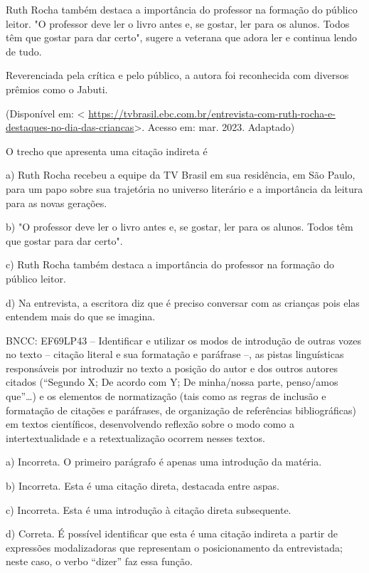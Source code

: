 Ruth Rocha também destaca a importância do professor na formação do
público leitor. "O professor deve ler o livro antes e, se gostar, ler
para os alunos. Todos têm que gostar para dar certo", sugere a veterana
que adora ler e continua lendo de tudo.

Reverenciada pela crítica e pelo público, a autora foi reconhecida com
diversos prêmios como o Jabuti.

(Disponível em: \textless{}
\url{https://tvbrasil.ebc.com.br/entrevista-com-ruth-rocha-e-destaques-no-dia-das-criancas}\textgreater.
Acesso em: mar. 2023. Adaptado)

O trecho que apresenta uma citação indireta é

a) Ruth Rocha recebeu a equipe da TV Brasil em sua residência, em São
Paulo, para um papo sobre sua trajetória no universo literário e a
importância da leitura para as novas gerações.

b) "O professor deve ler o livro antes e, se gostar, ler para os alunos.
Todos têm que gostar para dar certo".

c) Ruth Rocha também destaca a importância do professor na formação do
público leitor.

d) Na entrevista, a escritora diz que é preciso conversar com as
crianças pois elas entendem mais do que se imagina.

BNCC: EF69LP43 -- Identificar e utilizar os modos de introdução de
outras vozes no texto -- citação literal e sua formatação e paráfrase
--, as pistas linguísticas responsáveis por introduzir no texto a
posição do autor e dos outros autores citados (``Segundo X; De acordo
com Y; De minha/nossa parte, penso/amos que''\ldots) e os elementos de
normatização (tais como as regras de inclusão e formatação de citações e
paráfrases, de organização de referências bibliográficas) em textos
científicos, desenvolvendo reflexão sobre o modo como a
intertextualidade e a retextualização ocorrem nesses textos.

a) Incorreta. O primeiro parágrafo é apenas uma introdução da matéria.

b) Incorreta. Esta é uma citação direta, destacada entre aspas.

c) Incorreta. Esta é uma introdução à citação direta subsequente.

d) Correta. É possível identificar que esta é uma citação indireta a
partir de expressões modalizadoras que representam o posicionamento da
entrevistada; neste caso, o verbo ``dizer'' faz essa função.

